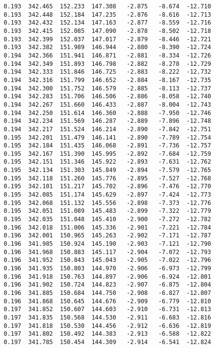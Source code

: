 \begin{verbatim}
   0.193  342.465  152.233  147.308   -2.875   -8.674  -12.710
   0.193  342.448  152.184  147.235   -2.876   -8.616  -12.713
   0.193  342.432  152.134  147.163   -2.877   -8.559  -12.716
   0.193  342.415  152.085  147.090   -2.878   -8.502  -12.718
   0.193  342.399  152.037  147.017   -2.879   -8.446  -12.721
   0.193  342.382  151.989  146.944   -2.880   -8.390  -12.724
   0.194  342.366  151.941  146.871   -2.881   -8.334  -12.726
   0.194  342.349  151.893  146.798   -2.882   -8.278  -12.729
   0.194  342.333  151.846  146.725   -2.883   -8.222  -12.732
   0.194  342.316  151.799  146.652   -2.884   -8.167  -12.735
   0.194  342.300  151.752  146.579   -2.885   -8.113  -12.737
   0.194  342.283  151.706  146.506   -2.886   -8.058  -12.740
   0.194  342.267  151.660  146.433   -2.887   -8.004  -12.743
   0.194  342.250  151.614  146.360   -2.888   -7.950  -12.746
   0.194  342.234  151.569  146.287   -2.889   -7.896  -12.748
   0.194  342.217  151.524  146.214   -2.890   -7.842  -12.751
   0.195  342.201  151.479  146.141   -2.890   -7.789  -12.754
   0.195  342.184  151.435  146.068   -2.891   -7.736  -12.757
   0.195  342.167  151.390  145.995   -2.892   -7.684  -12.759
   0.195  342.151  151.346  145.922   -2.893   -7.631  -12.762
   0.195  342.134  151.303  145.849   -2.894   -7.579  -12.765
   0.195  342.118  151.260  145.776   -2.895   -7.527  -12.768
   0.195  342.101  151.217  145.702   -2.896   -7.476  -12.770
   0.195  342.085  151.174  145.629   -2.897   -7.424  -12.773
   0.195  342.068  151.132  145.556   -2.898   -7.373  -12.776
   0.195  342.051  151.089  145.483   -2.899   -7.322  -12.779
   0.195  342.035  151.048  145.410   -2.900   -7.272  -12.782
   0.196  342.018  151.006  145.336   -2.901   -7.221  -12.784
   0.196  342.001  150.965  145.263   -2.902   -7.171  -12.787
   0.196  341.985  150.924  145.190   -2.903   -7.121  -12.790
   0.196  341.968  150.883  145.117   -2.904   -7.072  -12.793
   0.196  341.952  150.843  145.043   -2.905   -7.022  -12.796
   0.196  341.935  150.803  144.970   -2.906   -6.973  -12.799
   0.196  341.918  150.763  144.897   -2.906   -6.924  -12.801
   0.196  341.902  150.724  144.823   -2.907   -6.875  -12.804
   0.196  341.885  150.684  144.750   -2.908   -6.827  -12.807
   0.196  341.868  150.645  144.676   -2.909   -6.779  -12.810
   0.197  341.852  150.607  144.603   -2.910   -6.731  -12.813
   0.197  341.835  150.568  144.530   -2.911   -6.683  -12.816
   0.197  341.818  150.530  144.456   -2.912   -6.636  -12.819
   0.197  341.802  150.492  144.383   -2.913   -6.588  -12.822
   0.197  341.785  150.454  144.309   -2.914   -6.541  -12.824

\end{verbatim}
